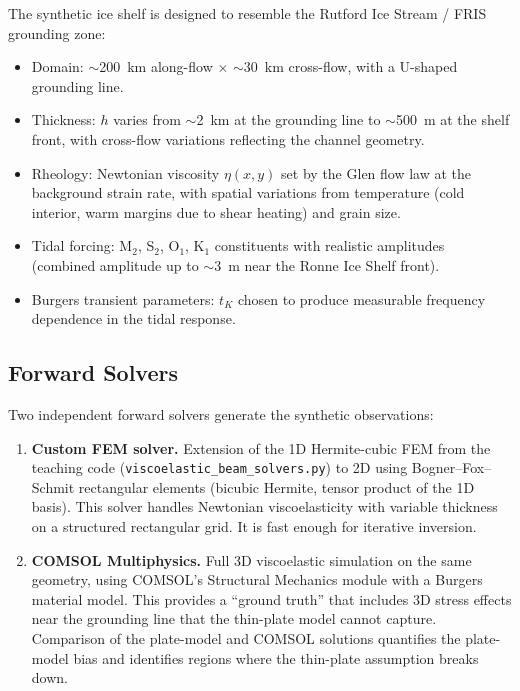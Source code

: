 \documentclass[11pt,letterpaper]{article}
\begin{document}
The synthetic ice shelf is designed to resemble the Rutford Ice Stream / FRIS grounding zone:
\begin{itemize}
  \item Domain: $\sim$200~km along-flow $\times$ $\sim$30~km cross-flow, with a U-shaped grounding line.
  \item Thickness: $h$ varies from $\sim$2~km at the grounding line to $\sim$500~m at the shelf front, with cross-flow variations reflecting the channel geometry.
  \item Rheology: Newtonian viscosity $\eta(x,y)$ set by the Glen flow law at the background strain rate, with spatial variations from temperature (cold interior, warm margins due to shear heating) and grain size.
  \item Tidal forcing: M$_2$, S$_2$, O$_1$, K$_1$ constituents with realistic amplitudes (combined amplitude up to $\sim$3~m near the Ronne Ice Shelf front).
  \item Burgers transient parameters: $t_K$ chosen to produce measurable frequency dependence in the tidal response.
\end{itemize}

\subsection{Forward Solvers}
\label{sec:forward_solvers}

Two independent forward solvers generate the synthetic observations:

\begin{enumerate}
  \item \textbf{Custom FEM solver.}  Extension of the 1D Hermite-cubic FEM from the teaching code (\texttt{viscoelastic\_beam\_solvers.py}) to 2D using Bogner--Fox--Schmit rectangular elements (bicubic Hermite, tensor product of the 1D basis).  This solver handles Newtonian viscoelasticity with variable thickness on a structured rectangular grid.  It is fast enough for iterative inversion.

  \item \textbf{COMSOL Multiphysics.}  Full 3D viscoelastic simulation on the same geometry, using COMSOL's Structural Mechanics module with a Burgers material model.  This provides a ``ground truth'' that includes 3D stress effects near the grounding line that the thin-plate model cannot capture.  Comparison of the plate-model and COMSOL solutions quantifies the plate-model bias and identifies regions where the thin-plate assumption breaks down.
\end{enumerate}
\end{document}
